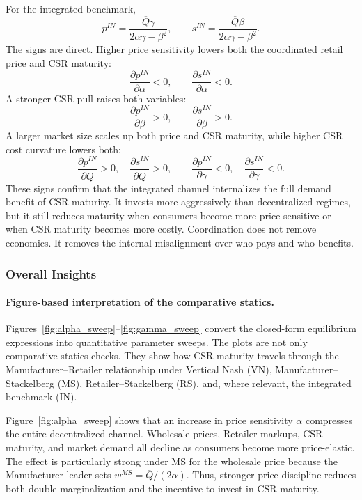 For the integrated benchmark,
\[
    p^{IN}=\frac{\overline Q\gamma}{2\alpha\gamma-\beta^2},
    \qquad
    s^{IN}=\frac{\overline Q\beta}{2\alpha\gamma-\beta^2}.
\]
The signs are direct. Higher price sensitivity lowers both the coordinated retail price and CSR maturity:
\[
    \frac{\partial p^{IN}}{\partial \alpha}<0,
    \qquad
    \frac{\partial s^{IN}}{\partial \alpha}<0.
\]
A stronger CSR pull raises both variables:
\[
    \frac{\partial p^{IN}}{\partial \beta}>0,
    \qquad
    \frac{\partial s^{IN}}{\partial \beta}>0.
\]
A larger market size scales up both price and CSR maturity, while higher CSR cost curvature lowers both:
\[
    \frac{\partial p^{IN}}{\partial \overline Q}>0,
    \quad
    \frac{\partial s^{IN}}{\partial \overline Q}>0,
    \qquad
    \frac{\partial p^{IN}}{\partial \gamma}<0,
    \quad
    \frac{\partial s^{IN}}{\partial \gamma}<0.
\]
These signs confirm that the integrated channel internalizes the full demand benefit of CSR maturity. It invests more aggressively than decentralized regimes, but it still reduces maturity when consumers become more price-sensitive or when CSR maturity becomes more costly. Coordination does not remove economics. It removes the internal misalignment over who pays and who benefits.

\subsubsection{Overall Insights}

\paragraph{Figure-based interpretation of the comparative statics.}
Figures~\ref{fig:alpha_sweep}--\ref{fig:gamma_sweep} convert the closed-form equilibrium
expressions into quantitative parameter sweeps. The plots are not only comparative-statics checks. They show how CSR maturity travels through the Manufacturer--Retailer relationship under Vertical Nash (VN), Manufacturer--Stackelberg (MS), Retailer--Stackelberg (RS), and, where relevant, the integrated benchmark (IN).

Figure~\ref{fig:alpha_sweep} shows that an increase in price sensitivity $\alpha$ compresses
the entire decentralized channel. Wholesale prices, Retailer markups, CSR maturity,
and market demand all decline as consumers become more price-elastic. The effect is
particularly strong under MS for the wholesale price because the Manufacturer leader sets
$w^{MS}=\overline Q/(2\alpha)$. Thus, stronger price discipline reduces both
double marginalization and the incentive to invest in CSR maturity.

